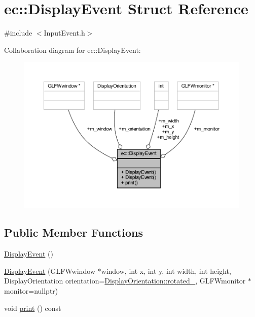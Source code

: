 \hypertarget{structec_1_1_display_event}{}\section{ec\+:\+:Display\+Event Struct Reference}
\label{structec_1_1_display_event}


{\ttfamily \#include $<$Input\+Event.\+h$>$}



Collaboration diagram for ec\+:\+:Display\+Event\+:\nopagebreak
\begin{figure}[H]
\begin{center}
\leavevmode
\includegraphics[width=350pt]{structec_1_1_display_event__coll__graph}
\end{center}
\end{figure}
\subsection*{Public Member Functions}
\begin{DoxyCompactItemize}
\item 
\mbox{\hyperlink{structec_1_1_display_event_a34ed8f096607ab02657e3599cd3d3211}{Display\+Event}} ()
\item 
\mbox{\hyperlink{structec_1_1_display_event_aa3ba57a1a866569e66bf13aa77d06bee}{Display\+Event}} (G\+L\+F\+Wwindow $\ast$window, int x, int y, int width, int height, Display\+Orientation orientation=\mbox{\hyperlink{_input_event_8h_a69ce17c829030355847d745e3ca3b9f3}{Display\+Orientation\+::rotated\+\_}}, G\+L\+F\+Wmonitor $\ast$monitor=nullptr)
\item 
void \mbox{\hyperlink{structec_1_1_display_event_a5e6bc91b25bc5fe6ffa8197f2fed32c2}{print}} () const
\end{DoxyCompactItemize}
